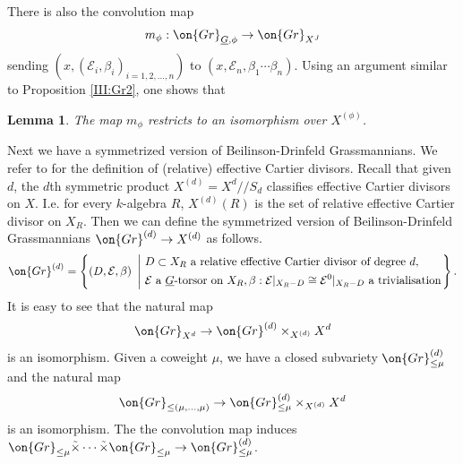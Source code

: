 \documentclass[]{pcmi}
\theoremstyle{plain}
\newtheorem{lem}[equation]{Lemma}
\theoremstyle{remark}
\theoremstyle{definition}
\newcommand{\mE}{{\mathcal E}}
\newcommand{\Gr}{{\on{Gr}}}
\begin{document}
There is also the convolution map
\[m_{\phi}: \Gr_{\underline G, \phi}\to \Gr_{X^J}\]
sending $(x,(\mE_{i},\beta_i)_{i=1,2,\ldots,n})$ to $(x, \mE_n, \beta_1\cdots\beta_n)$. Using an argument similar to Proposition \ref{III:Gr2}, one shows that
\begin{lem}\label{generic conv}
The map $m_\phi$ restricts to an isomorphism over $X^{(\phi)}$.
\end{lem}

Next we have a symmetrized version of Beilinson-Drinfeld Grassmannians. We refer to \cite[Tag01WQ, Tag056P]{St}  for the definition of (relative) effective Cartier divisors.
Recall that given $d$, the $d$th symmetric product $X^{(d)}=X^d/\!\!/S_d$ classifies effective Cartier divisors on $X$. I.e. for every $k$-algebra $R$, $X^{(d)}(R)$ is the set of relative effective Cartier divisor on $X_R$. 
 Then we can define the symmetrized version of Beilinson-Drinfeld Grassmannians $\Gr^{(d)}\to X^{(d)}$ as follows.
\begin{equation}\label{sym BD Grass}
\Gr^{(d)}=\left\{(D,\mE,\beta)\ \left|\ \begin{split}& D\subset X_R \mbox{ a relative effective Cartier divisor of degree } d, \\
&  \mE \mbox{ a } \underline{G}\mbox{-torsor on } X_R, \beta: \mE|_{X_R-D}\cong \mE^0|_{X_R-D} \mbox{ a trivialisation}\end{split}\right.\right\}.
\end{equation}
It is easy to see that the natural map
\[
\Gr_{X^d}\to \Gr^{(d)}\times_{X^{(d)}}X^d
\]
is an isomorphism.
Given a coweight $\mu$, we have a closed subvariety $\Gr^{(d)}_{\leq \mu}$ and the natural map
\[
\Gr_{\leq (\mu,\ldots,\mu)}\to\Gr^{(d)}_{\leq \mu}\times_{X^{(d)}}X^d
\]
is an isomorphism.
The the convolution map induces $\Gr_{\leq \mu}\tilde\times\cdots\tilde\times\Gr_{\leq \mu}\to \Gr_{\leq \mu}^{(d)}$.
\end{document}
